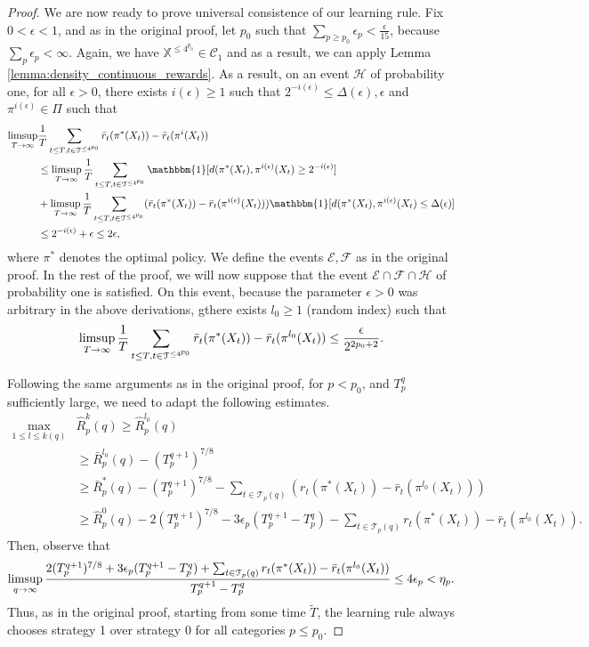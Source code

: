 \documentclass[aos]{imsart}
\theoremstyle{plain}
\theoremstyle{remark}
\newcommand{\Ccal}{\mathcal{C}}
\newcommand{\Ecal}{\mathcal{E}}
\newcommand{\Fcal}{\mathcal{F}}
\newcommand{\Hcal}{\mathcal{H}}
\newcommand{\Tcal}{\mathcal{T}}
\newcommand{\Xbb}{\mathbb{X}}
\newcommand{\1}{\mathbbm{1}}%
\renewcommand{\limsup}{\mathop{\rm limsup}}
\begin{document}
\begin{proof}
We are now ready to prove universal consistence of our learning rule. Fix $0<\epsilon<1$, and as in the original proof, let $p_0$ such that $\sum_{p\geq p_0}\epsilon_p<\frac{\epsilon}{15}$, because $\sum_p\epsilon_p<\infty$. Again, we have $\Xbb^{\leq 4^{p_0}} \in\Ccal_1$ and as a result, we can apply Lemma \ref{lemma:density_continuous_rewards}. As a result, on an event $\Hcal$ of probability one, for all $\epsilon>0$, there exists $i(\epsilon)\geq 1$ such that $2^{-i(\epsilon)} \leq \Delta(\epsilon),\epsilon$ and $\pi^{i(\epsilon)}\in\Pi$ such that
\begin{align*}
    \limsup_{T\to\infty}&\frac{1}{T} \sum_{t\leq T,t\in\Tcal^{\leq 4^{p_0}}} \bar r_t(\pi^*(X_t)) - \bar r_t(\pi^i(X_t)) \\
    &\leq \limsup_{T\to\infty}\frac{1}{T} \sum_{t\leq T,t\in\Tcal^{\leq 4^{p_0}}} \1[d(\pi^*(X_t),\pi^{i(\epsilon)}(X_t) \geq 2^{-i(\epsilon)}] \\
    &+ \limsup_{T\to\infty}\frac{1}{T} \sum_{t\leq T,t\in\Tcal^{\leq 4^{p_0}}} (\bar r_t(\pi^*(X_t)) - \bar r_t(\pi^{i(\epsilon)}(X_t)))\1[d(\pi^*(X_t),\pi^{i(\epsilon)}(X_t) \leq \Delta(\epsilon)]\\
    &\leq 2^{-i(\epsilon)} + \epsilon \leq 2\epsilon,
\end{align*}
where $\pi^*$ denotes the optimal policy. We define the events $\Ecal,\Fcal$ as in the original proof. In the rest of the proof, we will now suppose that the event $\Ecal\cap\Fcal\cap\Hcal$ of probability one is satisfied. On this event, because the parameter $\epsilon>0$ was arbitrary in the above derivations, gthere exists $l_0\geq 1$ (random index) such that 
\begin{equation*}
    \limsup_{T\to\infty} \frac{1}{T}\sum_{t\leq T,t\in\Tcal^{\leq 4^{p_0}}} \bar r_t(\pi^*(X_t)) - \bar r_t(\pi^{l_0}(X_t)) \leq \frac{\epsilon}{2^{2p_0+2}}.
\end{equation*}

Following the same arguments as in the original proof, for $p<p_0$, and $T_p^q$ sufficiently large, we need to adapt the following estimates.
\begin{align*}
    \max_{1\leq l\leq k(q)} &\hat R_p^k(q) 
    \geq \hat R_p^{l_0}(q)\\
    &\geq \bar R^{l_0}_p(q)  -(T_p^{q+1})^{7/8}\\
    &\geq \bar R_p^*(q)  -(T_p^{q+1})^{7/8} - \sum_{t\in\Tcal_p(q)}(r_t(\pi^*(X_t)) - \bar r_t(\pi^{l_0}(X_t)))
    \\
    &\geq \hat R_p^0(q) - 2(T_p^{q+1})^{7/8} - 3\epsilon_p (T_p^{q+1}-T_p^q) - \sum_{t\in\Tcal_p(q)}r_t(\pi^*(X_t)) - \bar r_t(\pi^{l_0}(X_t)).
\end{align*}
Then, observe that
\begin{equation*}
    \limsup_{q\to\infty} \frac{2(T_p^{q+1})^{7/8} + 3\epsilon_p (T_p^{q+1}-T_p^q) + \sum_{t\in\Tcal_p(q)}r_t(\pi^*(X_t)) - \bar r_t(\pi^{l_0}(X_t))}{T_p^{q+1}-T_p^q} \leq 4\epsilon_p<\eta_p.
\end{equation*}
Thus, as in the original proof, starting from some time $\tilde T$, the learning rule always chooses strategy 1 over strategy 0 for all categories $p\leq p_0$.


\end{proof}
\end{document}
